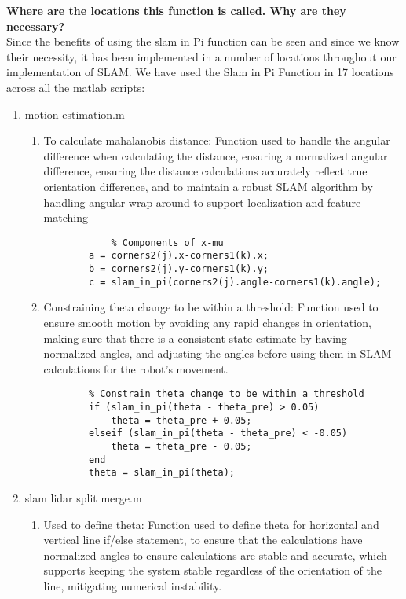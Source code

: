 \textbf{Where are the locations this function is called. Why are they necessary?}\\
Since the benefits of using the slam in Pi function can be seen and since we know their necessity, it has been implemented in a number of locations throughout our implementation of SLAM. We have used the Slam in Pi Function in 17 locations across all the matlab scripts:
\begin{enumerate}
    \item motion estimation.m
    \begin{enumerate}
        \item To calculate mahalanobis distance: Function used to handle the angular difference when calculating the distance, ensuring a normalized angular difference, ensuring the distance calculations accurately reflect true orientation difference, and to maintain a robust SLAM algorithm by handling angular wrap-around to support localization and feature matching
        \begin{lstlisting}
            % Components of x-mu
		a = corners2(j).x-corners1(k).x;
		b = corners2(j).y-corners1(k).y;
		c = slam_in_pi(corners2(j).angle-corners1(k).angle);
        \end{lstlisting}
        \item Constraining theta change to be within a threshold: Function used to ensure smooth motion by avoiding any rapid changes in orientation, making sure that there is a consistent state estimate by having normalized angles, and adjusting the angles before using them in SLAM calculations for the robot's movement.
        \begin{lstlisting}
        % Constrain theta change to be within a threshold
        if (slam_in_pi(theta - theta_pre) > 0.05)
            theta = theta_pre + 0.05;
        elseif (slam_in_pi(theta - theta_pre) < -0.05)
            theta = theta_pre - 0.05;
        end
        theta = slam_in_pi(theta);  
        \end{lstlisting}
    \end{enumerate}
    \item slam lidar split merge.m
    \begin{enumerate}
        \item Used to define theta: Function used to define theta for horizontal and vertical line if/else statement, to ensure that the calculations have normalized angles to ensure calculations are stable and accurate, which supports keeping the system stable regardless of the orientation of the line, mitigating numerical instability.

\end{enumerate}
\end{enumerate}
